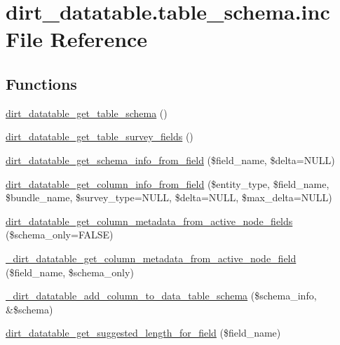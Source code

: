 \hypertarget{dirt__datatable_8table__schema_8inc}{}\section{dirt\+\_\+datatable.\+table\+\_\+schema.\+inc File Reference}
\label{dirt__datatable_8table__schema_8inc}
\subsection*{Functions}
\begin{DoxyCompactItemize}
\item 
\mbox{\hyperlink{dirt__datatable_8table__schema_8inc_a449f729d1e50c581e40927f5ed37e5bb}{dirt\+\_\+datatable\+\_\+get\+\_\+table\+\_\+schema}} ()
\item 
\mbox{\hyperlink{dirt__datatable_8table__schema_8inc_a5d2b9b69a657e7621354e0098fc3ada3}{dirt\+\_\+datatable\+\_\+get\+\_\+table\+\_\+survey\+\_\+fields}} ()
\item 
\mbox{\hyperlink{dirt__datatable_8table__schema_8inc_ac1f9a7bc5d7feaccafb207bb82e91f66}{dirt\+\_\+datatable\+\_\+get\+\_\+schema\+\_\+info\+\_\+from\+\_\+field}} (\$field\+\_\+name, \$delta=N\+U\+LL)
\item 
\mbox{\hyperlink{dirt__datatable_8table__schema_8inc_ad42887cff32d2bf1f63b6ac9cb67de60}{dirt\+\_\+datatable\+\_\+get\+\_\+column\+\_\+info\+\_\+from\+\_\+field}} (\$entity\+\_\+type, \$field\+\_\+name, \$bundle\+\_\+name, \$survey\+\_\+type=N\+U\+LL, \$delta=N\+U\+LL, \$max\+\_\+delta=N\+U\+LL)
\item 
\mbox{\hyperlink{dirt__datatable_8table__schema_8inc_a6c6181508a273c5cf2c61f6c18727e5e}{dirt\+\_\+datatable\+\_\+get\+\_\+column\+\_\+metadata\+\_\+from\+\_\+active\+\_\+node\+\_\+fields}} (\$schema\+\_\+only=F\+A\+L\+SE)
\item 
\mbox{\hyperlink{dirt__datatable_8table__schema_8inc_aa2bc2ba96af1c727040c5968114c5598}{\+\_\+dirt\+\_\+datatable\+\_\+get\+\_\+column\+\_\+metadata\+\_\+from\+\_\+active\+\_\+node\+\_\+field}} (\$field\+\_\+name, \$schema\+\_\+only)
\item 
\mbox{\hyperlink{dirt__datatable_8table__schema_8inc_aa7b7fb145809b5d03fd4ca88f513e72c}{\+\_\+dirt\+\_\+datatable\+\_\+add\+\_\+column\+\_\+to\+\_\+data\+\_\+table\+\_\+schema}} (\$schema\+\_\+info, \&\$schema)
\item 
\mbox{\hyperlink{dirt__datatable_8table__schema_8inc_ac72f76262f32a91445409599dba21090}{dirt\+\_\+datatable\+\_\+get\+\_\+suggested\+\_\+length\+\_\+for\+\_\+field}} (\$field\+\_\+name)

\end{DoxyCompactItemize}
